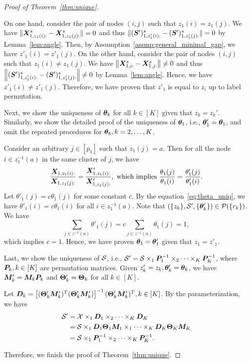 \documentclass[lettersize,journal]{IEEEtran}
\theoremstyle{definition}
\theoremstyle{definition}
\newcommand{\off}[1]{\left[#1\right]}
\begin{document}
\begin{proof}[Proof of Theorem~\ref{thm:unique}]
\begin{enumerate}
On one hand, consider the pair of nodes $(i,j)$ such that $z_1(i) = z_1(j)$. We have $\lVert\bm X_{1, z_1(i):}^s - \bm X_{1, z_1(j):}^s \rVert = 0$ and thus $\lVert (\bm S')_{1, z'_1(i):}^{s} - (\bm S')_{1, z'_1(j):}^{s} \rVert = 0$ by Lemma~\ref{lem:angle}. Then, by Assumption~\eqref{assmp:general_minimal_gap}, we have $z'_1(i) = z'_1(j)$. On the other hand, consider the pair of nodes $(i,j)$ such that $z_1(i) \neq z_1(j)$. We have $ \left\lVert\bm X_{1,i:}^s - \bm X_{1,j:}^s\right\rVert \neq 0$ and thus $\left\lVert (\bm S')_{1, z'_1(i):}^{s} - (\bm S')_{1, z'_1(j):}^{s} \right\rVert \neq 0$ by Lemma~\ref{lem:angle}. Hence, we have $z'_1(i) \neq z'_1(j)$. Therefore, we have proven that $z'_1$ is equal to $z_i$ up to label permutation.

Next, we show the uniqueness of $\boldsymbol{\theta}_k$ for all $k \in [K]$ given that $z_k = z_k'$. Similarly, we show the detailed proof of the uniqueness of $\boldsymbol{\theta}_1$, i.e., $\boldsymbol{\theta}'_1 = \boldsymbol{\theta}_1$, and omit the repeated procedures for $\boldsymbol{\theta}_k, k = 2,\ldots, K$.

Consider an arbitrary $j \in [p_1]$ such that $z_1(j) = a$. Then for all the node $i \in  z_1^{-1}(a)$ in the same cluster of $j$, we have 
\begin{equation}
    \frac{\mX_{1,z_1(i):}}{\mX_{1,z_1(j):}} = \frac{\mX'_{1,z_1(i):}}{\mX'_{1,z_1(j):}}, \text{ which implies }  \frac{\theta_1(j)}{\theta_1(i)} = \frac{\theta'_1(j)}{\theta'_1(i)}.\label{eq:theta_uniq}
\end{equation}
Let $\theta'_1(j) = c\theta_1(j)$ for some constant $c$. By the equation~\eqref{eq:theta_uniq}, we have $\theta'_1(i) = c \theta_1(i)$ for all $ i \in  z_1^{-1}(a)$. Note that $(\{z_k\}, \mathcal{S}', \{\boldsymbol{\theta}'_k\}) \in \mathcal{P}(\{r_k\})$. We have 
\begin{equation}
    \sum_{j \in z^{-1}(a)} \theta'_1(j) = c \sum_{j \in z^{-1}(a)} \theta_1(j) = 1,
\end{equation}
which implies $c = 1$. Hence, we have proven $\boldsymbol{\theta}_1 = \boldsymbol{\theta}'_1$ given that $z_1 = z'_1$.

Last, we show the uniqueness of $\mathcal{S}$, i.e., $\mathcal{S}'=\mathcal{S}\times_1 \bm{P}^{-1}_1\times_2\cdots \times_K \bm{P}^{-1}_K$, where $\bm{P}_k, k \in [K]$ are permutation matrices.  Given $z'_k = z_k, \boldsymbol{\theta}'_k = \boldsymbol{\theta}_k$, we have $\bm M'_k = \bm M_k \bm{P}_k$ and $\boldsymbol{\Theta}'_k = \boldsymbol{\Theta}_k$ for all $k \in [K]$. 

Let $\mD_k = \off{ (\mTheta'_k \mM'_k)^T (\mTheta'_k \mM'_k) }^{-1} (\mTheta'_k \mM'_k)^T, k \in [K]$. By the parameterization, we have 
\begin{align}
    \mathcal{S}' &= \mathcal{X} \times_1 \bm{D}_1 \times_2 \cdots \times_K \bm{D}_K \\
    &= \mathcal{S} \times_1 \bm{D}_1 \boldsymbol{\Theta}_1 \bm M_1 \times_1 \cdots \times_K \bm{D}_K \boldsymbol{\Theta}_K \bm M_K \\
    &= \mathcal{S} \times_1 \bm{P}^{-1}_1 \times_2 \cdots \times_K \bm{P}^{-1}_K.
\end{align}


\end{enumerate}

Therefore, we finish the proof of Theorem~\ref{thm:unique}.
\end{proof}
\end{document}
